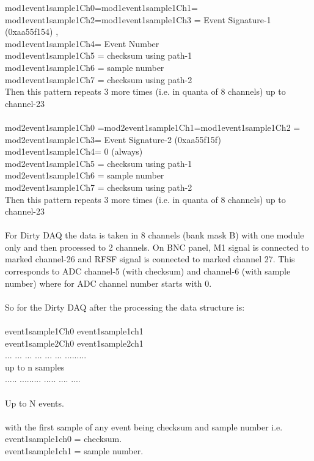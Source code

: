 \documentclass[12pt]{article}
\begin{document}
mod1event1sample1Ch0=mod1event1sample1Ch1=\\
mod1event1sample1Ch2=mod1event1sample1Ch3 = Event Signature-1 (0xaa55f154) ,\\ mod1event1sample1Ch4= Event Number\\
mod1event1sample1Ch5 = checksum using path-1  \\mod1event1sample1Ch6 = sample number \\mod1event1sample1Ch7 = checksum using path-2 \\
Then this pattern repeats 3 more times (i.e. in quanta of 8 channels) up to channel-23\\
\\
mod2event1sample1Ch0 =mod2event1sample1Ch1=mod1event1sample1Ch2 = mod2event1sample1Ch3= Event Signature-2 (0xaa55f15f) \\mod1event1sample1Ch4= 0 (always)\\
mod2event1sample1Ch5 = checksum using path-1 \\ mod2event1sample1Ch6 = sample number \\mod2event1sample1Ch7 = checksum using path-2 \\
Then this pattern repeats 3 more times (i.e. in quanta of 8 channels) up to channel-23\\
\\
For Dirty DAQ the data is taken in 8 channels (bank mask B) with one module only and then processed to 2 channels.
On BNC panel, M1 signal is connected to marked channel-26 and RFSF signal is connected to marked channel 27. This corresponds to 
ADC channel-5 (with checksum) and channel-6 (with sample number) where for ADC channel number starts with 0.\\
\\
So for the Dirty DAQ after the processing the data structure is:\\
\\
event1sample1Ch0   event1sample1ch1\\
event1sample2Ch0   event1sample2ch1\\
... ... ... ... ... ... .........\\
up to n samples\\
.....  .........  ..... .... ....\\
\\
Up to N events.\\
\\
with the first sample of any event being checksum and sample number i.e.\\
     event1sample1ch0 = checksum.\\
     event1sample1ch1 = sample number.\\
\end{document}
